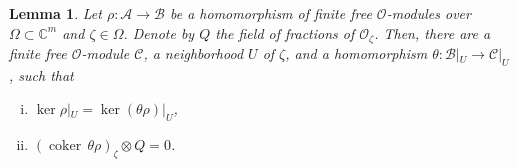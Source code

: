 \documentclass{amsart}
\numberwithin{equation}{section}
\theoremstyle{definition}
\theoremstyle{plain}
\newtheorem{lemma}[definition]{Lemma}
\theoremstyle{remark}
\begin{document}
\begin{lemma}\label{lemma_epimorphisms_reduce_to_torsion}
Let $\rho:{\ensuremath{\mathcal{{A}}}}\rightarrow {\ensuremath{\mathcal{{B}}}}$ be a homomorphism of finite free
${\ensuremath{\mathcal{{O}}}}$-modules over $\Omega\subset\mathbb{C}^m$ and $\zeta\in \Omega$. 
Denote by $Q$ the field of fractions of ${\ensuremath{\mathcal{{O}}}}_\zeta$.
Then, there are a finite free ${\ensuremath{\mathcal{{O}}}}$-module ${\ensuremath{\mathcal{{C}}}}$, a neighborhood $U$ of $\zeta$, and a homomorphism $\theta:{\ensuremath{\mathcal{{B}}}}|_U\rightarrow {\ensuremath{\mathcal{{C}}}}|_U$, such that
\begin{enumerate}[(i)]
\item $\ker \rho|_U=\ker (\theta\rho)|_U$,
\item $({{\mathop{\mathrm{coker\,}}}} \theta\rho)_\zeta\otimes Q=0$.
\end{enumerate}
\end{lemma}
\end{document}
